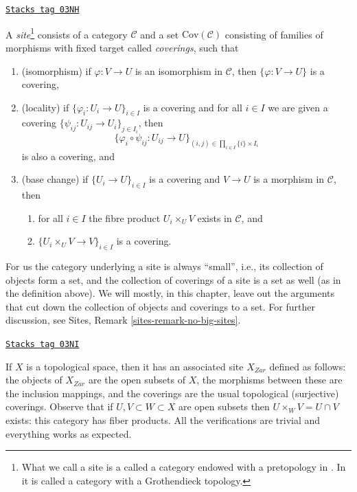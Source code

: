 \begin{definition}[Site]
\label{etale-cohomology-definition-site}
\href{https://stacks.math.columbia.edu/tag/03NH}{\texttt{Stacks tag 03NH}}

A {\it site}\footnote{What we call a site is a called a category endowed with
a pretopology in \cite[Expos\'e II, D\'efinition 1.3]{SGA4}.
In \cite{ArtinTopologies} it is called a category with a Grothendieck
topology.} consists of a category $\mathcal{C}$ and a set
$\text{Cov}(\mathcal{C})$ consisting of families of morphisms with fixed target
called {\it coverings}, such that
\begin{enumerate}
\item (isomorphism) if $\varphi : V \to U$ is an isomorphism in $\mathcal{C}$,
then $\{\varphi : V \to U\}$ is a covering,
\item (locality) if $\{\varphi_i : U_i \to U\}_{i\in I}$ is a covering and
for all $i \in I$ we are given a covering
$\{\psi_{ij} : U_{ij} \to U_i \}_{j\in I_i}$, then
$$
\{
\varphi_i \circ \psi_{ij} : U_{ij} \to U
\}_{(i, j)\in \prod_{i\in I} \{i\} \times I_i}
$$
is also a covering, and
\item (base change) if $\{U_i \to U\}_{i\in I}$
is a covering and $V \to U$ is a morphism in $\mathcal{C}$, then
\begin{enumerate}
\item for all $i \in I$ the fibre product
$U_i \times_U V$ exists in $\mathcal{C}$, and
\item $\{U_i \times_U V \to V\}_{i\in I}$ is a covering.
\end{enumerate}
\end{enumerate}
\end{definition}

For us the category underlying a site is always ``small'', i.e., its
collection of objects form a set, and the collection of coverings of
a site is a set as well (as in the definition above). We will mostly,
in this chapter, leave out the arguments that cut down the collection
of objects and coverings to a set. For further discussion, see
Sites, Remark \ref{sites-remark-no-big-sites}.

\begin{example}
\label{etale-cohomology-example-site-topological-space}
\href{https://stacks.math.columbia.edu/tag/03NI}{\texttt{Stacks tag 03NI}}

If $X$ is a topological space, then it has an associated site $X_{Zar}$
defined as follows: the objects of $X_{Zar}$ are the open subsets of $X$,
the morphisms between these are the inclusion mappings, and the coverings are
the usual topological (surjective) coverings. Observe that if
$U, V \subset W \subset X$ are open subsets then $U \times_W V = U \cap V$
exists: this category has fiber products. All the verifications are trivial and
everything works as expected.
\end{example}

